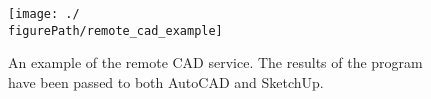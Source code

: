 


\begin{figure}
  \centering
  \texttt{[image: ./\\figurePath/remote\_cad\_example]}
  \caption[An example of the remote CAD service.]{An example of the remote CAD service. The results of the program have been passed to both AutoCAD and SketchUp.}
  \label{fig:remote:cad:example}
\end{figure}
